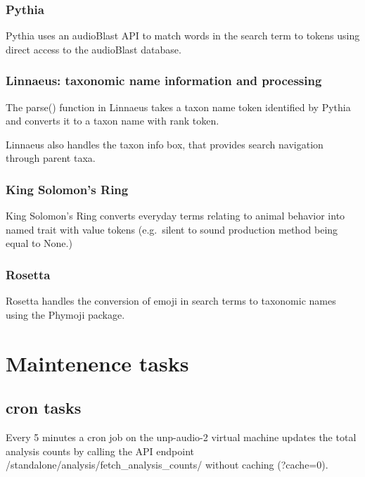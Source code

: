 \documentclass[
]{book}
\begin{document}
\hypertarget{pythia}{%
\subsection{Pythia}\label{pythia}}

Pythia uses an audioBlast API to match words in the search term to tokens using direct access to the audioBlast database.

\hypertarget{linnaeus-taxonomic-name-information-and-processing}{%
\subsection{Linnaeus: taxonomic name information and processing}\label{linnaeus-taxonomic-name-information-and-processing}}

The parse() function in Linnaeus takes a taxon name token identified by Pythia and converts it to a taxon name with rank token.

Linnaeus also handles the taxon info box, that provides search navigation through parent taxa.

\hypertarget{king-solomons-ring}{%
\subsection{King Solomon's Ring}\label{king-solomons-ring}}

King Solomon's Ring converts everyday terms relating to animal behavior into named trait with value tokens (e.g.~silent to sound production method being equal to None.)

\hypertarget{rosetta}{%
\subsection{Rosetta}\label{rosetta}}

Rosetta handles the conversion of emoji in search terms to taxonomic names using the Phymoji package.

\hypertarget{maintenence-tasks}{%
\chapter{Maintenence tasks}\label{maintenence-tasks}}

\hypertarget{cron-tasks}{%
\section{cron tasks}\label{cron-tasks}}

Every 5 minutes a cron job on the unp-audio-2 virtual machine updates the total analysis counts by calling the API endpoint /standalone/analysis/fetch\_analysis\_counts/ without caching (?cache=0).
\end{document}
